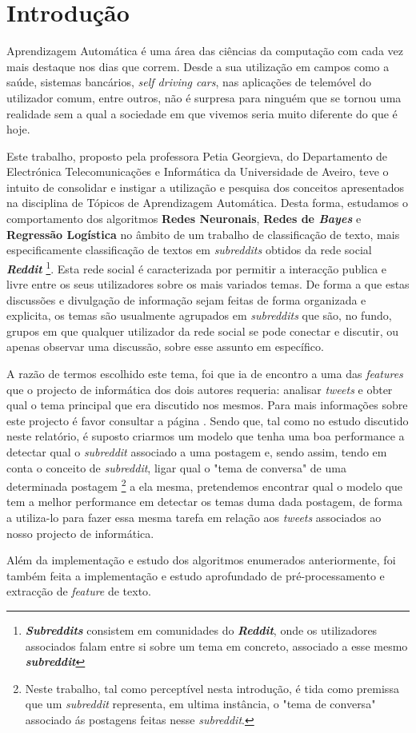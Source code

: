 \section{Introdução}
Aprendizagem Automática é uma área das ciências da computação com cada vez mais destaque nos dias que correm. Desde a sua utilização em campos como a saúde, sistemas bancários, \textit{self driving cars}, nas aplicações de telemóvel do utilizador comum, entre outros, não é surpresa para ninguém que se tornou uma realidade sem a qual a sociedade em que vivemos seria muito diferente do que é hoje. 

Este trabalho, proposto pela professora Petia Georgieva, do Departamento de Electrónica Telecomunicações e Informática da Universidade de Aveiro, teve o intuito de consolidar e instigar a utilização e pesquisa dos conceitos apresentados na disciplina de Tópicos de Aprendizagem Automática.
Desta forma, estudamos o comportamento dos algoritmos \textbf{Redes Neuronais}, \textbf{Redes de \textit{Bayes}} e \textbf{Regressão Logística} no âmbito de um trabalho de classificação de texto, mais especificamente classificação de textos em \textit{subreddits} obtidos da rede social \textit{\textbf{Reddit}} \footnote{\textbf{\textit{Subreddits}} consistem em comunidades do \textbf{\textit{Reddit}}, onde os utilizadores associados falam entre si sobre um tema em concreto, associado a esse mesmo \textbf{\textit{subreddit}}}. Esta rede social é caracterizada por permitir a interacção publica e livre entre os seus utilizadores sobre os mais variados temas. De forma a que estas discussões e divulgação de informação sejam feitas de forma organizada e explicita, os temas são usualmente agrupados em \textit{subreddits} que são, no fundo, grupos em que qualquer utilizador da rede social se pode conectar e discutir, ou apenas observar uma discussão, sobre esse assunto em específico.     %

A razão de termos escolhido este tema, foi que ia de encontro a uma das \textit{features} que o projecto de informática dos dois autores requeria: analisar \textit{tweets} e obter qual o tema principal que era discutido nos mesmos. Para mais informações sobre este projecto é favor consultar a página \cite{informatics_project}. Sendo que, tal como no estudo discutido neste relatório, é suposto criarmos um modelo que tenha uma boa performance a detectar qual o \textit{subreddit} associado a uma postagem e, sendo assim, tendo em conta o conceito de \textit{subreddit}, ligar qual o "tema de conversa" de uma determinada postagem \footnote{Neste trabalho, tal como perceptível nesta introdução, é tida como premissa que um \textit{subreddit} representa, em ultima instância, o "tema de conversa" associado ás postagens feitas nesse \textit{subreddit}.} a ela mesma, pretendemos encontrar qual o modelo que tem a melhor performance em detectar os temas duma dada postagem, de forma a utiliza-lo para fazer essa mesma tarefa em relação aos \textit{tweets} associados ao nosso projecto de informática.

Além da implementação e estudo dos algoritmos enumerados anteriormente, foi também feita a implementação e estudo aprofundado de pré-processamento e extracção de \textit{feature} de texto.
